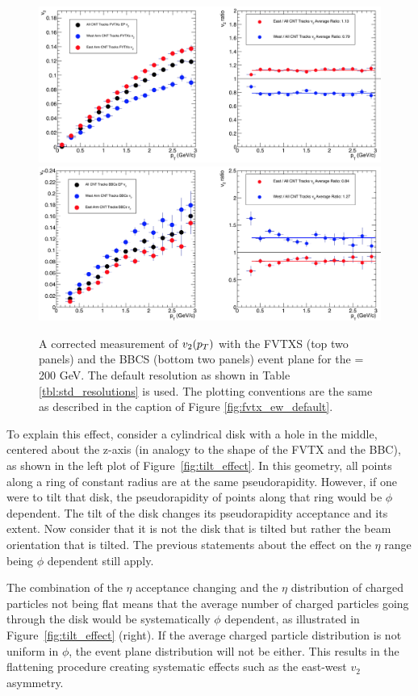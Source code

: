 \begin{figure}[!ht]
\centering
\includegraphics[width=0.85\linewidth]{figs/fvtx_vertex_rot_only.png}
\includegraphics[width=0.85\linewidth]{figs/bbc_vertex_rot_only.png}
\caption{A corrected measurement of $v_{2}(\mbox{$p_T$})$ with the FVTXS (top two panels) and the BBCS (bottom two panels) event plane for the \pau \sqsn = 200 GeV. The default resolution as shown in Table \ref{tbl:std_resolutions} is used. The plotting conventions are the same as described in the caption of Figure \ref{fig:fvtx_ew_default}. }
\label{fig:fvtx_ew_rot}
\end{figure}

To explain this effect, consider a cylindrical disk with a hole in the middle, centered about the z-axis (in analogy to the shape of the FVTX and the BBC), as shown in the left plot of Figure~\ref{fig:tilt_effect}. In this geometry, all points along a ring of constant radius are at the same pseudorapidity. However, if one were to tilt that disk, the pseudorapidity of points along that ring would be $\phi$ dependent. The tilt of the disk changes its pseudorapidity acceptance and its extent. Now consider that it is not the disk that is tilted but rather the beam orientation that is tilted. The previous statements about the effect on the $\eta$ range being $\phi$ dependent still apply. 

The combination of the $\eta$ acceptance changing and the $\eta$ distribution of charged particles not being flat means that the average number of charged particles going through the disk would be systematically $\phi$ dependent, as illustrated in Figure~\ref{fig:tilt_effect} (right). If the average charged particle distribution is not uniform in $\phi$, the event plane distribution will not be either. This results in the flattening procedure creating systematic effects such as the east-west $v_2$ asymmetry.

